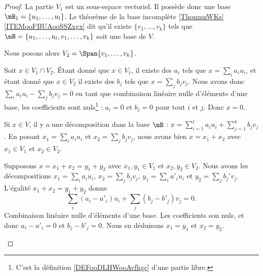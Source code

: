 \begin{proof}
	La partie \( V_1\) est un sous-espace vectoriel. Il possède donc une base \(\mB_1= \{ u_1,\ldots,u_l \}\). Le théorème de la base incomplète \ref{ThonmnWKs}\ref{ITEMooFBUAooSSZxgx} dit qu'il existe \( \{ v_1,\ldots,v_k \}\) tels que \( \mB=\{ u_1,\ldots,u_l,v_1,\ldots,v_k \}\) soit une base de \( V\).

	Nous posons alors \( V_2=\Span\{ v_1,\ldots,v_k \}\).
	\begin{subproof}
		\spitem[\( V_1\cap V_2=\{ 0 \}\)]
		Soit \( x\in V_1\cap V_2\). Étant donné que \( x\in V_1\), il existe des \( a_i\) tels que \( x=\sum_ia_iu_i\), et étant donné que \( x\in V_2\) il existe des \( b_j \) tels que \( x=\sum_jb_jv_j\). Nous avons donc \( \sum_ia_iu_i-\sum_jb_jv_j=0\) en tant que combinaison linéaire nulle d'éléments d'une base, les coefficients sont nuls\footnote{C'est la définition \ref{DEFooDLHWooAvfhgc} d'une partie libre.} : \( a_i=0\) et \( b_j=0\) pour tout \( i\) et \( j\). Donc \( x=0\).

		Si \( x\in V\), il y a une décomposition dans la base \( \mB\) : \( x=\sum_{i=1}^la_iu_i+  \sum_{j=1}^kb_jv_j\). En posant \( x_1=\sum_ia_iu_i\) et \( x_2=\sum_jb_jv_j\), nous avons bien \( x=x_1+x_2\) avec \( x_1\in V_1\) et \( x_2\in V_2\).

		Supposons \( x=x_1+x_2=y_1+y_2\) avec \( x_1,y_1\in V_1\) et \( x_2,y_2\in V_2\). Nous avons les décompositions \( x_1=\sum_ia_iu_i\), \( x_2=\sum_jb_jv_j\), \( y_1=\sum_ia'_iu_i\) et \( y_2=\sum_jb_j'v_j\). L'égalité \( x_1+x_2=y_1+y_2\) donne
		\begin{equation}
			\sum_i(a_i-a'_i)u_i+\sum_j(b_j-b'_j)v_j=0.
		\end{equation}
		Combinaison linéaire nulle d'éléments d'une base. Les coefficients son nuls, et donc \( a_i-a'_i=0\) et \( b_j-b'_j=0\). Nous en déduisons \( x_1=y_1\) et \( x_2=y_2\).
	\end{subproof}
\end{proof}



